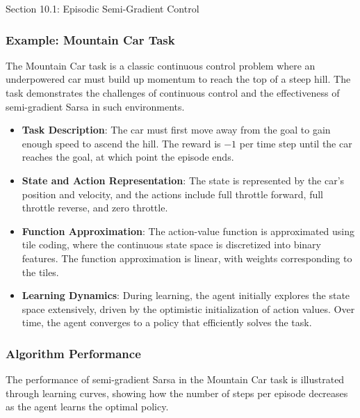 \begin{notes}{Section 10.1: Episodic Semi-Gradient Control}
\begin{highlight}
    \end{highlight}
    
    \subsubsection*{Example: Mountain Car Task}
    
    The Mountain Car task is a classic continuous control problem where an underpowered car must build up momentum to reach the top of a steep hill. The task demonstrates the challenges of continuous control 
    and the effectiveness of semi-gradient Sarsa in such environments.
    
    \begin{highlight}
    
        \begin{itemize}
            \item \textbf{Task Description}: The car must first move away from the goal to gain enough speed to ascend the hill. The reward is $-1$ per time step until the car reaches the goal, at which point the 
            episode ends.
            \item \textbf{State and Action Representation}: The state is represented by the car's position and velocity, and the actions include full throttle forward, full throttle reverse, and zero throttle.
            \item \textbf{Function Approximation}: The action-value function is approximated using tile coding, where the continuous state space is discretized into binary features. The function approximation is 
            linear, with weights corresponding to the tiles.
            \item \textbf{Learning Dynamics}: During learning, the agent initially explores the state space extensively, driven by the optimistic initialization of action values. Over time, the agent converges to a 
            policy that efficiently solves the task.
        \end{itemize}
    
    \end{highlight}
    
    \subsubsection*{Algorithm Performance}
    
    The performance of semi-gradient Sarsa in the Mountain Car task is illustrated through learning curves, showing how the number of steps per episode decreases as the agent learns the optimal policy.
    

\end{notes}
